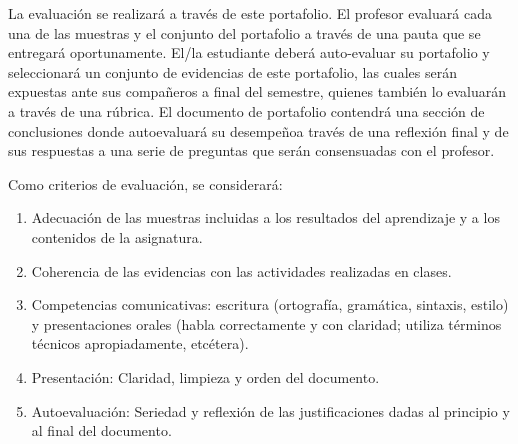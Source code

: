\documentclass[../portafolio.tex]{subfiles}
\begin{document}
\medskip

La evaluación se realizará a través de este portafolio. El profesor
evaluará cada una de las muestras y el conjunto del portafolio a
través de una pauta que se entregará oportunamente. El/la estudiante
deberá auto-evaluar su portafolio y seleccionará un conjunto de
evidencias de este portafolio, las cuales serán expuestas ante sus
compañeros a final del semestre, quienes también lo evaluarán a través
de una rúbrica. El documento de portafolio contendrá una sección de
conclusiones donde autoevaluará su desempeñoa través de una reflexión
final y de sus respuestas a una serie de preguntas que serán
consensuadas con el profesor.

\medskip

Como criterios de evaluación, se considerará:
\begin{enumerate}
\item Adecuación de las muestras incluidas a los resultados del
  aprendizaje y a los contenidos de la asignatura.
  
\item Coherencia de las evidencias con las actividades realizadas en clases.
  
\item Competencias comunicativas: escritura (ortografía, gramática,
  sintaxis, estilo) y presentaciones orales (habla correctamente y con
  claridad; utiliza términos técnicos apropiadamente, etcétera).
\item Presentación: Claridad, limpieza y orden del documento.  
\item Autoevaluación: Seriedad y reflexión de las justificaciones dadas al principio y al final del documento.

\end{enumerate}
\end{document}

